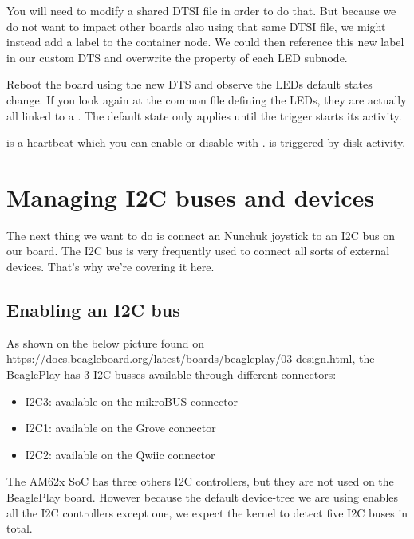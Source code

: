 You will need to modify a shared DTSI file in order to do that. But
because we do not want to impact other boards also using that same DTSI
file, we might instead add a label to the  container node. We
could then reference this new label in our custom DTS and overwrite the
 property of each LED subnode.

Reboot the board using the new DTS and observe the LEDs default states change.
If you look again at the common file defining the LEDs, they are actually all
linked to a . The default state only applies until
the trigger starts its activity.

 is a heartbeat which you can enable or disable with
.  is triggered by disk
activity.

\section{Managing I2C buses and devices}

The next thing we want to do is connect an Nunchuk joystick
to an I2C bus on our board. The I2C bus is very frequently used
to connect all sorts of external devices. That's why we're covering
it here.

\subsection{Enabling an I2C bus}

As shown on the below picture found on
\url{https://docs.beagleboard.org/latest/boards/beagleplay/03-design.html}, the
BeaglePlay has 3 I2C busses available through different connectors:

\begin{itemize}
\item I2C3: available on the mikroBUS connector
\item I2C1: available on the Grove connector
\item I2C2: available on the Qwiic connector
\end{itemize}

The AM62x SoC has three others I2C controllers, but they are not used on the
BeaglePlay board. However because the default device-tree we are using enables
all the I2C controllers except one, we expect the kernel to detect five I2C
buses in total.

